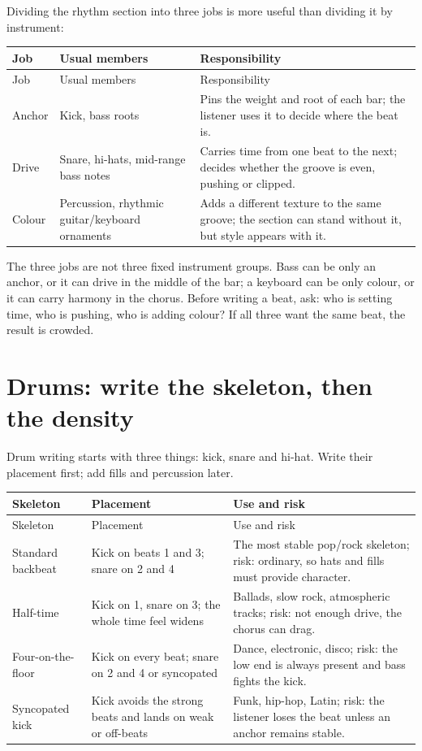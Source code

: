 Dividing the rhythm section into three jobs is more useful than dividing it by instrument:

\begin{longtable}{p{}p{}p{}}
\toprule
Job & Usual members & Responsibility \\
\midrule
\endfirsthead
\toprule
Job & Usual members & Responsibility \\
\midrule
\endhead
Anchor & Kick, bass roots & Pins the weight and root of each bar; the listener uses it to decide where the beat is. \\
Drive & Snare, hi-hats, mid-range bass notes & Carries time from one beat to the next; decides whether the groove is even, pushing or clipped. \\
Colour & Percussion, rhythmic guitar/keyboard ornaments & Adds a different texture to the same groove; the section can stand without it, but style appears with it. \\
\bottomrule
\end{longtable}

The three jobs are not three fixed instrument groups. Bass can be only an anchor, or it can drive in the middle of the bar; a keyboard can be only colour, or it can carry harmony in the chorus. Before writing a beat, ask: who is setting time, who is pushing, who is adding colour? If all three want the same beat, the result is crowded.

\section{Drums: write the skeleton, then the density}
\label{sec:drums}

Drum writing starts with three things: kick, snare and hi-hat. Write their placement first; add fills and percussion later.

\begin{longtable}{p{}p{}p{}}
\toprule
Skeleton & Placement & Use and risk \\
\midrule
\endfirsthead
\toprule
Skeleton & Placement & Use and risk \\
\midrule
\endhead
Standard backbeat & Kick on beats 1 and 3; snare on 2 and 4 & The most stable pop/rock skeleton; risk: ordinary, so hats and fills must provide character. \\
Half-time & Kick on 1, snare on 3; the whole time feel widens & Ballads, slow rock, atmospheric tracks; risk: not enough drive, the chorus can drag. \\
Four-on-the-floor & Kick on every beat; snare on 2 and 4 or syncopated & Dance, electronic, disco; risk: the low end is always present and bass fights the kick. \\
Syncopated kick & Kick avoids the strong beats and lands on weak or off-beats & Funk, hip-hop, Latin; risk: the listener loses the beat unless an anchor remains stable. \\
\bottomrule
\end{longtable}

